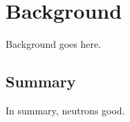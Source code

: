 \chapter{Background}
\label{chap:bg}

Background goes here.



\section{Summary}

In summary, neutrons good.

